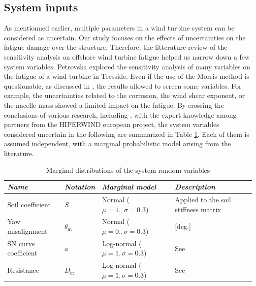\subsection{System inputs}
As mentionned earlier, multiple parameters in a wind turbine system can be considered as uncertain. 
Our study focuses on the effects of uncertainties on the fatigue damage over the structure. 
Therefore, the litterature review of the sensitivity analysis on offshore wind turbine fatigue helped us narrow down a few system variables. 
Petrovska explored the sensitivity analysis of many variables on the fatigue of a wind turbine in Teesside. 
Even if the use of the Morris method is questionable, as discussed in \citet{petrovska_2022}, the results allowed to screen some variables. 
For example, the uncertainties related to the corrosion, the wind shear exponent, or the nacelle mass showed a limited impact on the fatigue.     
By crossing the conclusions of various research, including , with the expert knowledge among partners from the HIPERWIND european project, the system variables considered uncertain in the following are summarized in Table \ref{tab:sys_variables}.
Each of them is assumed independent, with a marginal probabilistic model arising from the literature. 


\begin{table}[h!]
    \centering
    \begin{tabular}{ l l l l}
        \hline
        {\it Name} & {\it Notation} & {\it Marginal model} & {\it Description}\\
        \hline
        Soil coefficient & $S$ & Normal ($\mu=1., \sigma=0.3$) & Applied to the soil stiffness matrix\\
        Yaw misalignment & $\theta_{\mathrm{m}}$ & Normal ($\mu=0., \sigma=0.3$) & [deg.] \\
        SN curve coefficient & $a$ & Log-normal ($\mu=1, \sigma=0.3$) & See \cite{guede_2007}\\
        Resistance & $D_{\mathrm{cr}}$ & Log-normal ($\mu=1, \sigma=0.3$) & See \cite{drexler_musculus_2021}\\\hline
    \end{tabular}
    \caption{Marginal distributions of the system random variables}
    \label{tab:sys_variables}
\end{table}




